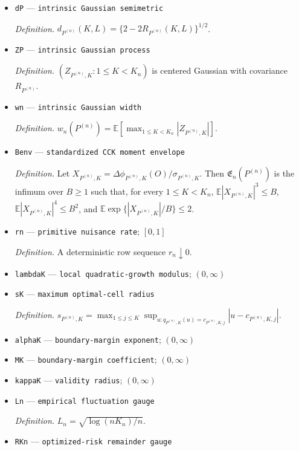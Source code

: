 \documentclass{article}
\begin{document}
\begin{itemize}
  \item \texttt{dP} --- \texttt{intrinsic Gaussian semimetric}
  \par\smallskip\noindent\emph{Definition.} \(d_{P^{(n)}}(K,L)=\{2-2R_{P^{(n)}}(K,L)\}^{1/2}\).
  \item \texttt{ZP} --- \texttt{intrinsic Gaussian process}
  \par\smallskip\noindent\emph{Definition.} \((Z_{P^{(n)},K}:1\le K<K_n)\) is centered Gaussian with covariance \(R_{P^{(n)}}\).
  \item \texttt{wn} --- \texttt{intrinsic Gaussian width}
  \par\smallskip\noindent\emph{Definition.} \(w_n(P^{(n)})=\mathbb E[\max_{1\le K<K_n}|Z_{P^{(n)},K}|]\).
  \item \texttt{Benv} --- \texttt{standardized CCK moment envelope}
  \par\smallskip\noindent\emph{Definition.} Let \(X_{P^{(n)},K}=\Delta\phi_{P^{(n)},K}(O)/\sigma_{P^{(n)},K}\). Then \(\mathfrak E_n(P^{(n)})\) is the infimum over \(B\geq1\) such that, for every \(1\leq K<K_n\), \(\mathbb E|X_{P^{(n)},K}|^3\leq B\), \(\mathbb E|X_{P^{(n)},K}|^4\leq B^2\), and \(\mathbb E\exp\{|X_{P^{(n)},K}|/B\}\leq2\).
  \item \texttt{rn} --- \texttt{primitive nuisance rate}; \([0,1]\)
  \par\smallskip\noindent\emph{Definition.} A deterministic row sequence \(r_n\downarrow0\).
  \item \texttt{lambdaK} --- \texttt{local quadratic-\allowbreak{}growth modulus}; \((0,\infty)\)
  \item \texttt{sK} --- \texttt{maximum optimal-\allowbreak{}cell radius}
  \par\smallskip\noindent\emph{Definition.} \(s_{P^{(n)},K}=\max_{1\le j\le K}\sup_{u:q_{P^{(n)},K}(u)=c_{P^{(n)},K,j}}|u-c_{P^{(n)},K,j}|\).
  \item \texttt{alphaK} --- \texttt{boundary-\allowbreak{}margin exponent}; \((0,\infty)\)
  \item \texttt{MK} --- \texttt{boundary-\allowbreak{}margin coefficient}; \((0,\infty)\)
  \item \texttt{kappaK} --- \texttt{validity radius}; \((0,\infty)\)
  \item \texttt{Ln} --- \texttt{empirical fluctuation gauge}
  \par\smallskip\noindent\emph{Definition.} \(L_n=\sqrt{\log(nK_n)/n}\).
  \item \texttt{RKn} --- \texttt{optimized-\allowbreak{}risk remainder gauge}

\end{itemize}
\end{document}
